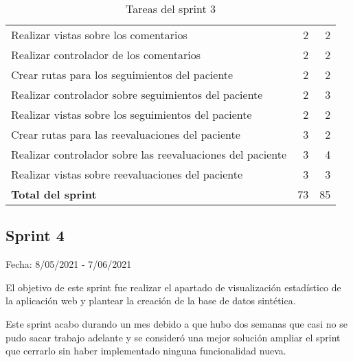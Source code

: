\begin{table}[H]
\begin{tabularx}{\linewidth}{X r r}
        Realizar vistas sobre los comentarios & 2 & 2 \\
        Realizar controlador de los comentarios & 2 & 2 \\
        Crear rutas para los seguimientos del paciente & 2 & 2 \\
        Realizar controlador sobre seguimientos del paciente & 2 & 3 \\
        Realizar vistas sobre los seguimientos del paciente & 2 & 2 \\
        Crear rutas para las reevaluaciones del paciente & 3 & 2 \\
        Realizar controlador sobre las reevaluaciones del paciente & 3 & 4 \\
        Realizar vistas sobre reevaluaciones del paciente & 3 & 3 \\
        \midrule
	    \textbf{Total del sprint} & 73 & 85 \\
	 	\bottomrule
	 \end{tabularx}
	 \caption{Tareas del sprint 3}
\end{table}

\subsection{Sprint 4}

Fecha: 8/05/2021 - 7/06/2021

El objetivo de este sprint fue realizar el apartado de visualización estadístico de la aplicación web y plantear la creación de la base de datos sintética.

Este sprint acabo durando un mes debido a que hubo dos semanas que casi no se pudo sacar trabajo adelante y se consideró una mejor solución ampliar el sprint que cerrarlo sin haber implementado ninguna funcionalidad nueva.


